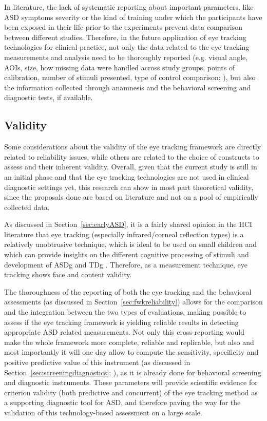 In literature, the lack of systematic reporting about important parameters, like ASD symptoms severity \citep{chitategmark2016socialattention} or the kind of training under which the participants have been exposed in their life prior to the experiments \citep{boraston2007eyetrackingASD} prevent data comparison between different studies. Therefore, in the future application of eye tracking technologies for clinical practice, not only the data related to the eye tracking measurements and analysis need to be thoroughly reported (e.g. visual angle, AOIs, size, how missing data were handled across study groups, points of calibration, number of stimuli presented, type of control comparison; \citealp{frazier2017socialgaze}), but also the information collected through anamnesis and the behavioral screening and diagnostic tests, if available.


\subsection{Validity}
\label{sec:fwkvalidity}

Some considerations about the validity of the eye tracking framework are directly related to reliability issues, while others are related to the choice of constructs to assess and their inherent validity.
Overall, given that the current study is still in an initial phase and that the eye tracking technologies are not used in clinical diagnostic settings yet, this research can show in most part theoretical validity, since the proposals done are based on literature and not on a pool of empirically collected data.

As discussed in Section~\ref{sec:earlyASD}, it is a fairly shared opinion in the HCI literature that eye tracking (especially infrared/corneal reflection types) is a relatively unobtrusive technique, which is ideal to be used on small children and which can provide insights on the different cognitive processing of stimuli and development of ASDg and TDg \citep{subrahmaniam2013animation,giordano2017eyetrackersystem,samad2017markers,bolte2016detection,falck-ytter2013eyetrackingASD}. Therefore, as a measurement technique, eye tracking shows face and content validity.

The thoroughness of the reporting of both the eye tracking and the behavioral assessments (as discussed in Section~\ref{sec:fwkreliability}) allows for the comparison and the integration between the two types of evaluations, making possible to assess if the eye tracking framework is yielding reliable results in detecting appropriate ASD related measurements. Not only this cross-reporting would make the whole framework more complete, reliable and replicable, but also and most importantly it will one day allow to compute the sensitivity, specificity and positive predictive value of this instrument (as discussed in Section~\ref{sec:screeningdiagnostics}; \citealp{charman2013measuerement}), as it is already done for behavioral screening and diagnostic instruments. These parameters will provide scientific evidence for criterion validity (both predictive and concurrent) of the eye tracking method as a supporting diagnostic tool for ASD, and therefore paving the way for the validation of this technology-based assessment on a large scale.

